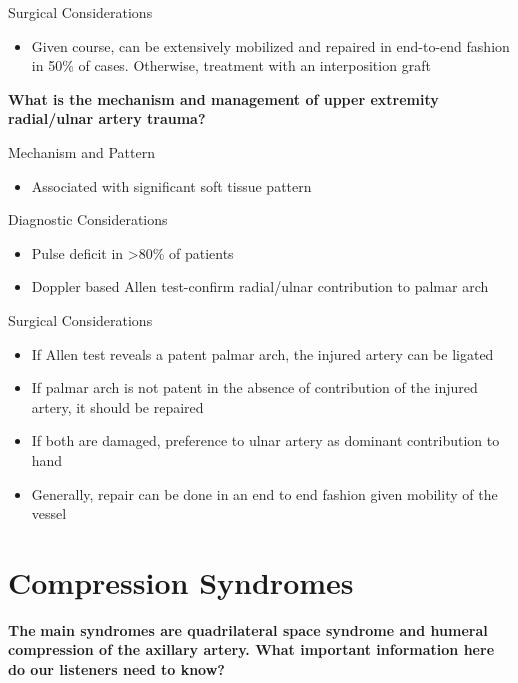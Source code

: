 \documentclass[
]{book}
\providecommand{\tightlist}{%
  \setlength{\itemsep}{0pt}\setlength{\parskip}{0pt}}
\begin{document}
Surgical Considerations~

\begin{itemize}
\tightlist
\item
  Given course, can be extensively mobilized and repaired in
  end-to-end fashion in 50\% of cases. Otherwise, treatment with an
  interposition graft
\end{itemize}

\textbf{What is the mechanism and management of upper extremity radial/ulnar
artery trauma?}

Mechanism and Pattern

\begin{itemize}
\tightlist
\item
  Associated with significant soft tissue pattern
\end{itemize}

Diagnostic Considerations

\begin{itemize}
\item
  Pulse deficit in \textgreater80\% of patients~
\item
  Doppler based Allen test-confirm radial/ulnar contribution to palmar
  arch
\end{itemize}

Surgical Considerations~

\begin{itemize}
\item
  If Allen test reveals a patent palmar arch, the injured artery can
  be ligated~
\item
  If palmar arch is not patent in the absence of contribution of the
  injured artery, it should be repaired
\item
  If both are damaged, preference to ulnar artery as dominant
  contribution to hand~
\item
  Generally, repair can be done in an end to end fashion given
  mobility of the vessel
\end{itemize}

\hypertarget{compression-syndromes}{%
\section{Compression Syndromes}\label{compression-syndromes}}

\textbf{The} \textbf{main syndromes are quadrilateral space syndrome and humeral
compression of the axillary artery. What important information here do
our listeners need to know?}
\end{document}
